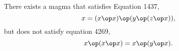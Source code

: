 %
%
%



\begin{theorem}[1437 example]\label{1437-thm}  There exists a magma that satisfies Equation 1437,
  $$ x = (x \op x) \op (y \op (z \op x)),$$
but does not satisfy equation 4269,
$$ x \op (x \op x) = x \op (y \op x).$$
\end{theorem}


